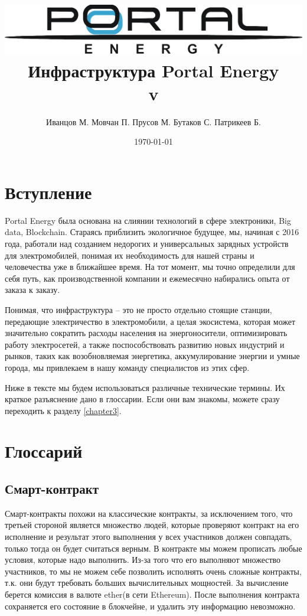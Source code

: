 \documentclass[a4paper,12pt]{report}
\title{\includegraphics[width=14cm]{logo}\\[2cm]Инфраструктура Portal Energy \\\normalsize v\versionnumber}
\author{Иванцов М. Мовчан П. Прусов М. Бутаков С. Патрикеев Б.}
\date{\today}
\begin{document}
%
\maketitle
\tableofcontents
\clearpage


\chapter{Вступление}

Portal Energy была основана на слиянии технологий в сфере электроники, Big data, Blockchain. Стараясь приблизить экологичное будущее, мы, начиная с 2016 года, работали над созданием недорогих и универсальных зарядных устройств для электромобилей, понимая их необходимость для нашей страны и человечества уже в ближайшее время. На тот момент, мы точно определили для себя путь, как производственной компании и ежемесячно набирались опыта от заказа к заказу. 

Понимая, что инфраструктура – это не просто отдельно стоящие станции, передающие электричество в электромобили, а целая экосистема, которая может значительно сократить расходы населения на энергоносители, оптимизировать работу электросетей, а также поспособствовать развитию новых индустрий и рынков, таких как возобновляемая энергетика, аккумулирование энергии и умные города, мы привлекаем в нашу команду специалистов из этих сфер.

Ниже в тексте мы будем использоваться различные технические термины. Их краткое разъяснение дано в глоссарии. Если они вам знакомы, можете сразу переходить к разделу \ref{chapter3}.


\chapter{Глоссарий}

\section{Смарт-контракт}
Смарт-контракты похожи на классические контракты, за исключением того, что третьей стороной является множество людей, которые проверяют контракт на его исполнение и результат этого выполнения у всех участников должен совпадать, только тогда он будет считаться верным. В контракте мы можем прописать любые условия, которые надо выполнить. Из-за того что его выполняют множество участников, то мы не можем себе позволить исполнять очень сложные контракты, т.к. они будут требовать больших вычислительных мощностей. За вычисление берется комиссия в валюте ether(в сети Ethereum). После выполнения контракта сохраняется его состояние в блокчейне,
и удалить эту информацию невозможно.
\end{document}
